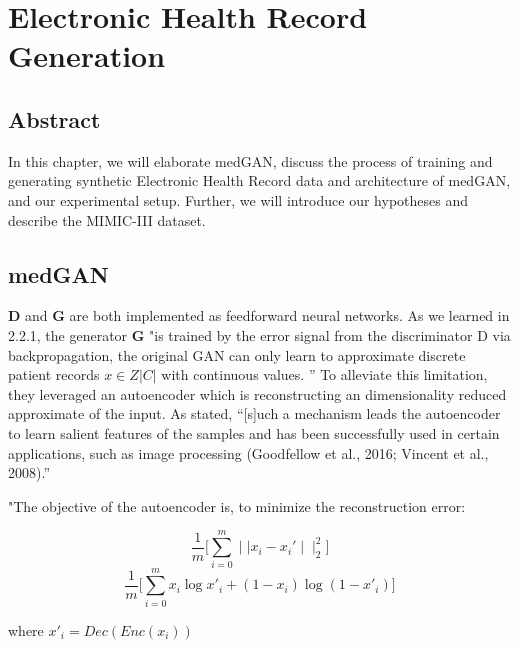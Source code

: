 \documentclass[11pt, a4paper]{book}
\begin{document}
\chapter{Electronic Health Record Generation}
\section{Abstract}
In this chapter, we will elaborate medGAN, discuss the process of training and generating synthetic Electronic Health Record data and architecture of medGAN, and our experimental setup. Further, we will introduce our hypotheses and describe the MIMIC-III dataset.
\section{medGAN}
\textbf{D} and \textbf{G} are both implemented as feedforward neural networks.
As we learned in 2.2.1, the generator \textbf{G} "is trained by the error signal from the discriminator D via backpropagation, the original GAN can only learn to approximate discrete patient records $x \in Z|C|$ with continuous values. ” \cite{Choi2017}
To alleviate this limitation, they leveraged an autoencoder which is reconstructing an dimensionality reduced approximate of the input. As \cite{Choi2017} stated, “[s]uch a mechanism leads the autoencoder to learn salient features of the samples and has been successfully used in certain applications, such as image processing (Goodfellow et al., 2016; Vincent et al., 2008).” 

"The objective of the autoencoder is, to minimize the reconstruction error:

\begin{equation}
\frac{1}{m}\big[\sum_{i=0}^m \mid\mid x_i - x_i'\mid\mid_2^2]
\end{equation}
\begin{equation}
\frac{1}{m}\big[\sum_{i=0}^m x_i \log x'_i + (1-x_i) \log (1-x'_i)]
\end{equation} 
\begin{center}
where $x'_i = Dec(Enc(x_i))$
\end{center}
\end{document}
